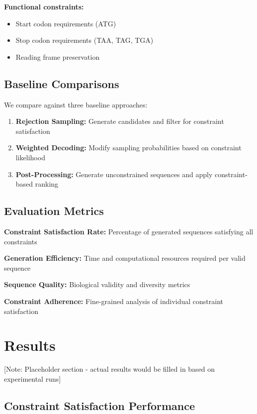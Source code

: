 \documentclass[conference]{IEEEtran}
\begin{document}
\textbf{Functional constraints:}
\begin{itemize}
    \item Start codon requirements (ATG)
    \item Stop codon requirements (TAA, TAG, TGA)
    \item Reading frame preservation
\end{itemize}

\subsection{Baseline Comparisons}

We compare against three baseline approaches:

\begin{enumerate}
    \item \textbf{Rejection Sampling:} Generate candidates and filter for constraint satisfaction
    \item \textbf{Weighted Decoding:} Modify sampling probabilities based on constraint likelihood
    \item \textbf{Post-Processing:} Generate unconstrained sequences and apply constraint-based ranking
\end{enumerate}

\subsection{Evaluation Metrics}

\textbf{Constraint Satisfaction Rate:} Percentage of generated sequences satisfying all constraints

\textbf{Generation Efficiency:} Time and computational resources required per valid sequence

\textbf{Sequence Quality:} Biological validity and diversity metrics

\textbf{Constraint Adherence:} Fine-grained analysis of individual constraint satisfaction

\section{Results}

[Note: Placeholder section - actual results would be filled in based on experimental runs]

\subsection{Constraint Satisfaction Performance}
\end{document}
